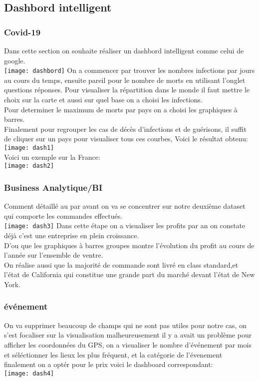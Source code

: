 \documentclass[french,a4paper,11pt,oneside]{book}
\begin{document}
{{		}
		\newpage
		\subsection{Dashbord intelligent}{
			
			\subsubsection{Covid-19}{
				Dans cette section on souhaite réaliser un dashbord intelligent comme celui de google.\\
				\texttt{[image: dashbord]}
				On a commencer par trouver les nombres infections par jours au cours du temps, ensuite pareil pour le nombre de morts en utilisant l'onglet questions réponses.
				Pour visualiser la répartition dans le monde il faut mettre le choix sur la carte et aussi sur quel base on a choisi les infections.\\
				Pour determiner le maximum de morts par pays on a choisi les graphiques à barres.\\
				Finalement pour regrouper les cas de décès d'infections et de guérisons, il suffit de cliquer sur un pays pour visualiser tous ces courbes, Voici le résultat obtenu:\\
				\texttt{[image: dash1]}
				\\
				Voici un exemple sur la France: \\
				\texttt{[image: dash2]}
			
			}
			\subsubsection{Business Analytique/BI}{
				Comment détaillé au par avant on va se concentrer sur notre deuxième dataset qui comporte les commandes effectués.\\
				\texttt{[image: dash3]}
				Dans cette étape on a visualiser les profits par an on constate déjà c'est une entreprise en plein croissance.\\
				D'ou que les graphiques à barres groupes montre l'évolution du profit au cours de l'année sur l'ensemble de ventre.\\
				On réalise aussi que la majorité de commande sont livré en class standard,et l'état de California qui constitue une grande part du marché devant l'état de New York.	
			}
		
			\subsubsection{événement}{
				On va supprimer beaucoup de champs qui ne sont pas utiles pour notre cas, on s'est focaliser sur la visualisation malheureusement il y a avait un problème pour afficher les coordonnées du GPS, on a visualiser le nombre d'événement par mois et séléctionner les lieux les plus fréquent, et la catégorie de l'évenement finalement on a optér pour le prix voici le dashboard correspondant:\\
				\texttt{[image: dash4]}
			
}}}
\end{document}
